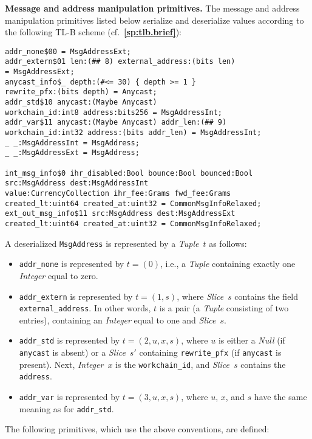 \documentclass[12pt,oneside]{article}
\def\makepoint#1{\medbreak\noindent{\bf #1.\ }}
\def\nxsubpoint{\refstepcounter{subsubsection}%
    \smallbreak\makepoint{\thesubsubsection}}
\def\refpoint#1{{\rm\textbf{\ref{#1}}}}
\let\ptref=\refpoint
\def\emb#1{\textbf{#1.}}
\begin{document}
\nxsubpoint\emb{Message and address manipulation primitives}
The message and address manipulation primitives listed below serialize and deserialize values according to the following TL-B scheme (cf.~\ptref{sp:tlb.brief}):
\begin{verbatim}
addr_none$00 = MsgAddressExt;
addr_extern$01 len:(## 8) external_address:(bits len)
= MsgAddressExt;
anycast_info$_ depth:(#<= 30) { depth >= 1 }
rewrite_pfx:(bits depth) = Anycast;
addr_std$10 anycast:(Maybe Anycast)
workchain_id:int8 address:bits256 = MsgAddressInt;
addr_var$11 anycast:(Maybe Anycast) addr_len:(## 9)
workchain_id:int32 address:(bits addr_len) = MsgAddressInt;
_ _:MsgAddressInt = MsgAddress;
_ _:MsgAddressExt = MsgAddress;

int_msg_info$0 ihr_disabled:Bool bounce:Bool bounced:Bool
src:MsgAddress dest:MsgAddressInt
value:CurrencyCollection ihr_fee:Grams fwd_fee:Grams
created_lt:uint64 created_at:uint32 = CommonMsgInfoRelaxed;
ext_out_msg_info$11 src:MsgAddress dest:MsgAddressExt
created_lt:uint64 created_at:uint32 = CommonMsgInfoRelaxed;
\end{verbatim}
A deserialized {\tt MsgAddress} is represented by a {\em Tuple\/}~$t$ as follows:
\begin{itemize}
\item {\tt addr\_none} is represented by $t=(0)$, i.e., a {\em Tuple\/} containing exactly one {\em Integer\/} equal to zero.
\item {\tt addr\_extern} is represented by $t=(1,s)$, where {\em Slice\/}~$s$ contains the field {\tt external\_address}. In other words, $t$ is a pair (a {\em Tuple\/} consisting of two entries), containing an {\em Integer\/} equal to one and {\em Slice}~$s$.
\item {\tt addr\_std} is represented by $t=(2,u,x,s)$, where $u$ is either a {\em Null\/} (if {\tt anycast} is absent) or a {\em Slice\/}~$s'$ containing {\tt rewrite\_pfx} (if {\tt anycast} is present). Next, {\em Integer\/}~$x$ is the {\tt workchain\_id}, and {\em Slice\/}~$s$ contains the {\tt address}.
\item {\tt addr\_var} is represented by $t=(3,u,x,s)$, where $u$, $x$, and $s$ have the same meaning as for {\tt addr\_std}.
\end{itemize}
The following primitives, which use the above conventions, are defined:
\end{document}
